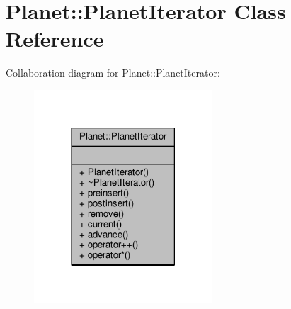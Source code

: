 \hypertarget{classPlanet_1_1PlanetIterator}{}\section{Planet\+:\+:Planet\+Iterator Class Reference}
\label{classPlanet_1_1PlanetIterator}


Collaboration diagram for Planet\+:\+:Planet\+Iterator\+:
\nopagebreak
\begin{figure}[H]
\begin{center}
\leavevmode
\includegraphics[width=189pt]{df/dd9/classPlanet_1_1PlanetIterator__coll__graph}
\end{center}
\end{figure}
